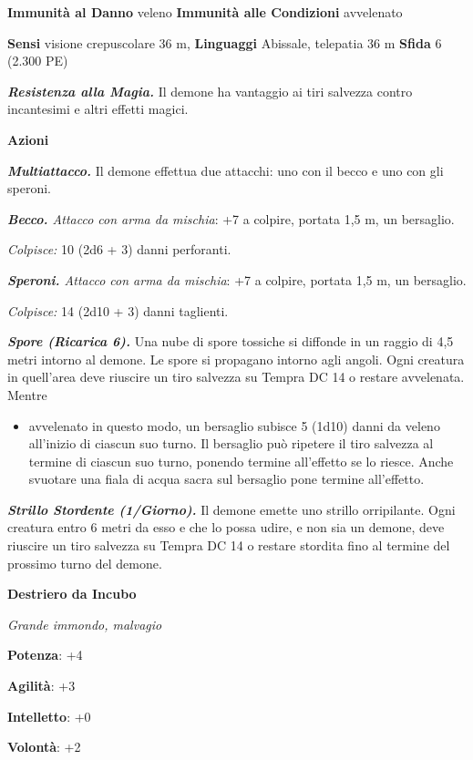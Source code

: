 \begin{multicols}{2}
\textbf{Immunità al Danno} veleno \textbf{Immunità alle Condizioni}
avvelenato

\textbf{Sensi} visione crepuscolare 36 m, 
\textbf{Linguaggi} Abissale, telepatia 36 m \textbf{Sfida} 6 (2.300 PE)

\emph{\textbf{Resistenza alla Magia.}} Il demone ha vantaggio ai tiri
salvezza contro incantesimi e altri effetti magici.

\textbf{Azioni}

\emph{\textbf{Multiattacco.}} Il demone effettua due attacchi: uno con
il becco e uno con gli speroni.

\emph{\textbf{Becco.} Attacco con arma da mischia}: +7 a colpire,
portata 1,5 m, un bersaglio.

\emph{Colpisce:} 10 (2d6 + 3) danni perforanti.

\emph{\textbf{Speroni.} Attacco con arma da mischia}: +7 a colpire,
portata 1,5 m, un bersaglio.

\emph{Colpisce:} 14 (2d10 + 3) danni taglienti.

\emph{\textbf{Spore (Ricarica 6).}} Una nube di spore tossiche si
diffonde in un raggio di 4,5 metri intorno al demone. Le spore si
propagano intorno agli angoli. Ogni creatura in quell'area deve riuscire
un tiro salvezza su Tempra DC 14 o restare avvelenata. Mentre


\begin{itemize}
\item
  avvelenato in questo modo, un bersaglio subisce 5 (1d10) danni da
  veleno all'inizio di ciascun suo turno. Il bersaglio può ripetere il
  tiro salvezza al termine di ciascun suo turno, ponendo termine
  all'effetto se lo riesce. Anche svuotare una fiala di acqua sacra sul
  bersaglio pone termine all'effetto.
\end{itemize}


\emph{\textbf{Strillo Stordente (1/Giorno).}} Il demone emette uno
strillo orripilante. Ogni creatura entro 6 metri da esso e che lo possa
udire, e non sia un demone, deve riuscire un tiro salvezza su Tempra DC 14 o restare stordita fino al termine del prossimo turno
del demone.


\textbf{Destriero da Incubo}

\emph{Grande immondo, malvagio}

\textbf{Potenza}: +4

\textbf{Agilità}: +3

\textbf{Intelletto}: +0

\textbf{Volontà}: +2


\end{multicols}
